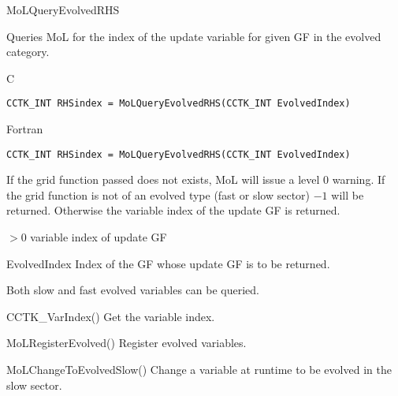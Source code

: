 \begin{FunctionDescription}{MoLQueryEvolvedRHS}
  \label{CactusBase_MoL_MoLQueryEvolvedRHS}
  
  Queries  MoL for the index of the update variable for given GF in the
  evolved category.

  \begin{SynopsisSection}
    \begin{Synopsis}{C}
\begin{verbatim}
CCTK_INT RHSindex = MoLQueryEvolvedRHS(CCTK_INT EvolvedIndex)
\end{verbatim}
    \end{Synopsis}
    \begin{Synopsis}{Fortran}
\begin{verbatim}
CCTK_INT RHSindex = MoLQueryEvolvedRHS(CCTK_INT EvolvedIndex)
\end{verbatim}
    \end{Synopsis}
  \end{SynopsisSection}

  \begin{ResultSection}
    \begin{ResultNote}
        If the grid function passed does not exists, MoL will issue a level 0
        warning. If the grid function is not of an evolved type (fast or slow
        sector) $-1$ will be returned. Otherwise the variable
        index of the update GF is returned.
    \end{ResultNote}
    \begin{Result}{$> 0$}
      variable index of update GF
    \end{Result}
  \end{ResultSection}

  \begin{ParameterSection}
    \begin{Parameter}{EvolvedIndex}
      Index of the GF whose update GF is to be returned.
    \end{Parameter}
  \end{ParameterSection}

  \begin{Discussion}
    Both slow and fast evolved variables can be queried.
  \end{Discussion}

  \begin{SeeAlsoSection}
    \begin{SeeAlso}{CCTK\_VarIndex()}
      Get the variable index.
    \end{SeeAlso}
    \begin{SeeAlso}{MoLRegisterEvolved()}
      Register evolved variables.
    \end{SeeAlso}
    \begin{SeeAlso}{MoLChangeToEvolvedSlow()}
      Change a variable at runtime to be evolved in the slow sector.
    \end{SeeAlso}
  \end{SeeAlsoSection}


\end{FunctionDescription}
